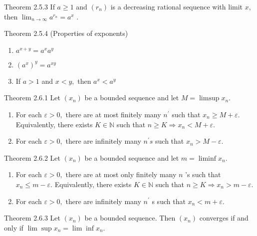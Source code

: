 \documentclass[10pt,landscape]{article}
\theoremstyle{definition}
\newcommand{\thistheoremname}{}
\newtheorem*{genericthm*}{\thistheoremname}
\newenvironment{namedthm*}[1]
{\renewcommand{\thistheoremname}{#1}\begin{genericthm*}}
{\end{genericthm*}}
\begin{document}
\begin{multicols}{3}
	\begin{namedthm*}{Theorem 2.5.3}
		If \(a \geq 1\) and \(\left(r_{n}\right)\) is a decreasing rational sequence with limit \(x,\) then
		\(
		\lim _{n \rightarrow \infty} a^{r_{n}}=a^{x} \text { . }
		\)
	\end{namedthm*}

	\begin{namedthm*}{Theorem 2.5.4 (Properties of exponents)}
		~
		\begin{enumerate}
			\item \(a^{x+y}=a^{x} a^{y}\)
			\item \(\left(a^{x}\right)^{y}=a^{x y}\)
			\item If \(a>1\) and \(x<y,\) then \(a^{x}<a^{y}\)
		\end{enumerate}
	\end{namedthm*}

	\begin{namedthm*}{Theorem 2.6.1}
		Let \(\left(x_{n}\right)\) be a bounded sequence and let \(M=\limsup x_{n}\).
		\begin{enumerate}
			\item For each \(\varepsilon>0,\) there are at most finitely many \(n^{\prime}\) such that \(x_{n} \geq M+\varepsilon .\) Equivalently, there exists \(K \in \mathbb{N}\) such that \(n \geq K \Longrightarrow x_{n}<M+\varepsilon\).
			\item For each \(\varepsilon>0,\) there are infinitely many \(n^{\prime} s\) such that \(x_{n}>M-\varepsilon\).
		\end{enumerate}
	\end{namedthm*}

	\begin{namedthm*}{Theorem 2.6.2}
		Let \(\left(x_{n}\right)\) be a bounded sequence and let \(m=\liminf x_{n}\).
		\begin{enumerate}
			\item For each \(\varepsilon>0,\) there are at most only finitely many \(n\) 's such that \(x_{n} \leq m-\varepsilon .\) Equivalently, there exists \(K \in \mathbb{N}\) such that \(n \geq K \Longrightarrow x_{n}>m-\varepsilon\).
			\item For each \(\varepsilon>0,\) there are infinitely many \(n^{\prime}\) s such that \(x_{n}<m+\varepsilon .\)
		\end{enumerate}
	\end{namedthm*}

	\begin{namedthm*}{Theorem 2.6.3}
		Let \(\left(x_{n}\right)\) be a bounded sequence. Then \(\left(x_{n}\right)\) converges if and only if
		\(
		\lim \sup x_{n}=\lim \inf x_{n}
		\).
	\end{namedthm*}



\end{multicols}
\end{document}
